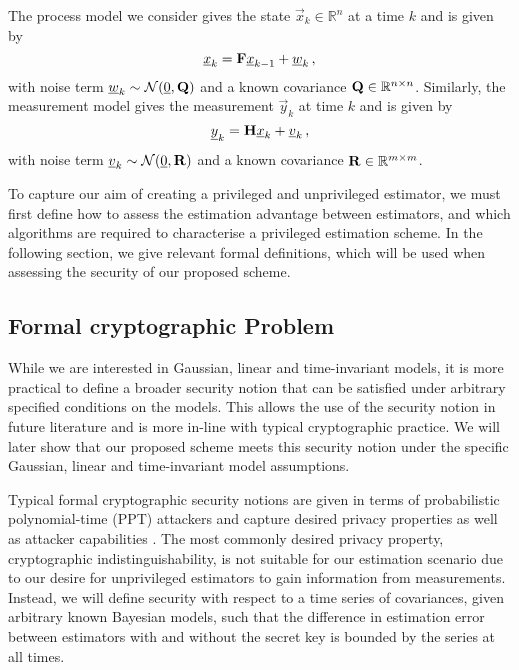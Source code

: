 \documentclass[letterpaper, 10 pt, conference]{IEEEtran}
\theoremstyle{definition}
\theoremstyle{definition}
\theoremstyle{remark}
\begin{document}
The process model we consider gives the state $\vec{x}_k\in\mathbb{R}^n$ at a time $k$ and is given by
\begin{equation}\label{eqn:linear_process_model}
   \vec{x}_k = \mat{F}\vec{x}_{k-1} + \vec{w}_k\,,
\end{equation}
with noise term ${\underline{w}}_k\sim \mathcal{N}({\underline{0}}, {{\mathbf{Q}}})$ and a known covariance ${{\mathbf{Q}}}\in \mathbb{R}^{n\times n}$. Similarly, the measurement model gives the measurement $\vec{y}_k$ at time $k$ and is given by
\begin{equation}\label{eqn:linear_measurement_model}
   \vec{y}_k = \mat{H}\vec{x}_k + \vec{v}_k\,,
\end{equation}
with noise term ${\underline{v}}_k\sim \mathcal{N}({\underline{0}}, {{\mathbf{R}}})$ and a known covariance ${{\mathbf{R}}}\in \mathbb{R}^{m\times m}$.

To capture our aim of creating a privileged and unprivileged estimator, we must first define how to assess the estimation advantage between estimators, and which algorithms are required to characterise a privileged estimation scheme. In the following section, we give relevant formal definitions, which will be used when assessing the security of our proposed scheme.

% 
% 

\subsection{Formal cryptographic Problem}\label{subsec:crypto_problem}
While we are interested in Gaussian, linear and time-invariant models, it is more practical to define a broader security notion that can be satisfied under arbitrary specified conditions on the models. This allows the use of the security notion in future literature and is more in-line with typical cryptographic practice. We will later show that our proposed scheme meets this security notion under the specific Gaussian, linear and time-invariant model assumptions.

Typical formal cryptographic security notions are given in terms of probabilistic polynomial-time (PPT) attackers and capture desired privacy properties as well as attacker capabilities \cite{katzIntroductionModernCryptography2008}. The most commonly desired privacy property, cryptographic indistinguishability, is not suitable for our estimation scenario due to our desire for unprivileged estimators to gain  information from measurements. Instead, we will define security with respect to a time series of covariances, given arbitrary known Bayesian models, such that the difference in estimation error between estimators with and without the secret key is bounded by the series at all times.
\end{document}
